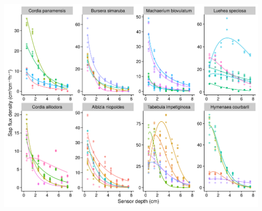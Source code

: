 \documentclass[usepdftitle=false]{beamer}
\begin{document}
\begin{frame}
	\includegraphics[height=\textheight]{figures/HFD_02_profiles.png}
\end{frame}
\end{document}
